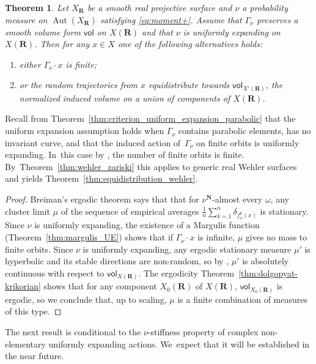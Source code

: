 \documentclass[JEP,XML,SOM,Unicode,published]{cedram}
\newenvironment{enumeratea}
{\bgroup\def\theenumi{\alph{enumi}}\begin{enumerate}}
{\end{enumerate}\egroup}
\newcommand{\unsur}[1]{\frac{1}{#1}}
\DeclareMathOperator{\aut}{Aut}
\def\R{\mathbf{R}}
\def\N{\mathbf{N}}
\newcommand{\vol}{{\mathsf{vol}}}
\theoremstyle{plain}
\newtheorem{thm}{Theorem}[section]
\theoremstyle{definition}
\begin{document}
\begin{thm}
Let $X_\R$ be a smooth
real projective surface and $\nu$ a probability measure on $\aut(X_\R)$ satisfying \eqref{eq:moment+}.
Assume that $\Gamma_\nu$ preserves a smooth volume form $\vol$ on $X(\R)$ and that $\nu$ is uniformly
expanding on $X(\R)$. Then for any $x\in X$ one of the following alternatives holds:
\begin{enumeratea}
\item either $\Gamma_\nu\cdot x$ is finite;
\item or the random trajectories from $x$ equidistribute
towards $\vol_{X'(\R)}$, the normalized induced volume on a
union of components of $X(\R)$.
\end{enumeratea}
\end{thm}

Recall from Theorem~\ref{thm:criterion_uniform_expansion_parabolic} that the uniform expansion assumption
holds when $\Gamma_\nu$
contains parabolic elements, has no invariant curve, and that the induced
action of~$\Gamma_\nu$ on finite orbits is uniformly expanding. In~this case by \cite[Th.\,C]{finite_orbits},
the number of finite orbits is finite. By~Theorem~\ref{thm:wehler_zariski} this applies to generic real Wehler
surfaces and yields Theorem~\ref{thm:equidistribution_wehler}.

\begin{proof}
Breiman's ergodic theorem says that that for $\nu^\N$-almost every $\omega$, any cluster limit $\mu$
of the sequence of empirical averages $\unsur{n} \sum_{k=1}^n \delta_{f_\omega^k(x)}$ is stationary.
Since $\nu$ is uniformly expanding, the existence of a Margulis function (Theorem~\ref{thm:margulis_UE}) shows that if $\Gamma_\nu\cdot x$ is infinite, $\mu$ gives no mass to finite orbits.
Since $\nu$ is uniformly expanding, any ergodic stationary measure $\mu'$ is hyperbolic and its stable directions are non-random, so by \cite[Th.\,3.4]{br}, $\mu'$ is absolutely continuous with respect to $\vol_{X(\R)}$. The ergodicity
Theorem~\ref{thm:dolgopyat-krikorian} shows that for any component $X_0(\R)$ of $X(\R)$, $\vol_{X_0(\R)}$ is ergodic, so
we conclude that, up to scaling, $\mu$ is a finite combination of measures of this type.
\end{proof}

The next result is conditional to the $\nu$-stiffness property of
complex non-elementary uniformly expanding actions. We~expect that
it will be established in the near future.
\end{document}
